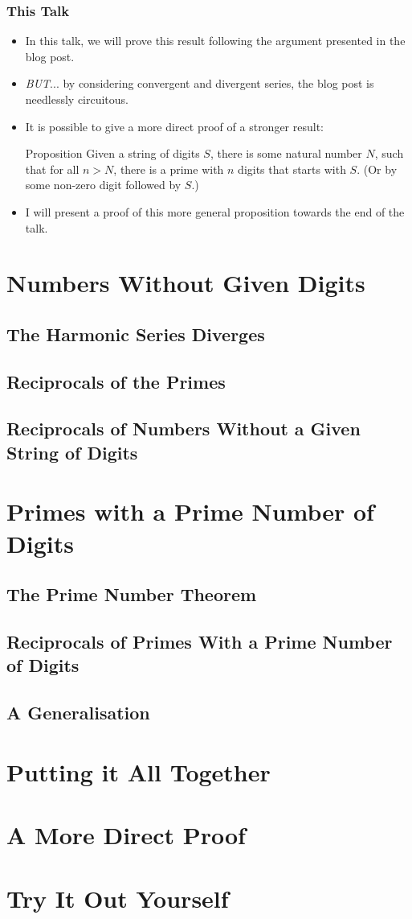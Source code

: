 \documentclass{beamer}
\begin{document}
\begin{frame}
    \frametitle{This Talk}

    \begin{itemize}
        \item In this talk, we will prove this result following the argument presented in the blog post. \pause
        \item \emph{BUT}... by considering convergent and divergent series, the blog post is needlessly circuitous. \pause
        \item It is possible to give a more direct proof of a stronger result:
        \begin{block}{Proposition}
            Given a string of digits $S$, there is some natural number $N$, such that for all $n > N$, there is a prime with $n$ digits that starts with $S$. (Or by some non-zero digit followed by $S$.)
        \end{block} \pause
        \item I will present a proof of this more general proposition towards the end of the talk.
    \end{itemize}    

\end{frame}

\section{Numbers Without Given Digits}
\subsection{The Harmonic Series Diverges}
\subsection{Reciprocals of the Primes}
\subsection{Reciprocals of Numbers Without a Given String of Digits}

\section{Primes with a Prime Number of Digits}
\subsection{The Prime Number Theorem}
\subsection{Reciprocals of Primes With a Prime Number of Digits}
\subsection{A Generalisation}

\section{Putting it All Together}

\section{A More Direct Proof}

\section{Try It Out Yourself}
\end{document}
